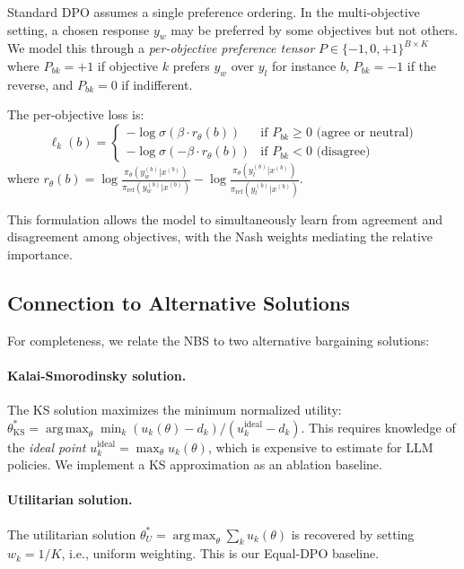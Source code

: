 \documentclass{article}
\DeclareMathOperator*{\argmax}{arg\,max}
\newcommand{\piref}{\pi_{\text{ref}}}
\begin{document}
Standard DPO assumes a single preference ordering.
In the multi-objective setting, a chosen response $y_w$ may be preferred by some objectives but not others.
We model this through a \emph{per-objective preference tensor} $P \in \{-1, 0, +1\}^{B \times K}$ where $P_{bk} = +1$ if objective $k$ prefers $y_w$ over $y_l$ for instance $b$, $P_{bk} = -1$ if the reverse, and $P_{bk} = 0$ if indifferent.

The per-objective loss is:
\begin{equation}
\ell_k(b) = \begin{cases}
-\log\sigma(\beta \cdot r_\theta(b)) & \text{if } P_{bk} \geq 0 \text{ (agree or neutral)} \\
-\log\sigma(-\beta \cdot r_\theta(b)) & \text{if } P_{bk} < 0 \text{ (disagree)}
\end{cases}
\label{eq:per_obj_loss}
\end{equation}
where $r_\theta(b) = \log\frac{\pi_\theta(y_w^{(b)}|x^{(b)})}{\piref(y_w^{(b)}|x^{(b)})} - \log\frac{\pi_\theta(y_l^{(b)}|x^{(b)})}{\piref(y_l^{(b)}|x^{(b)})}$.

This formulation allows the model to simultaneously learn from agreement and disagreement among objectives, with the Nash weights mediating the relative importance.

\subsection{Connection to Alternative Solutions}

For completeness, we relate the NBS to two alternative bargaining solutions:

\paragraph{Kalai-Smorodinsky solution.}
The KS solution maximizes the minimum normalized utility: $\theta^*_{\text{KS}} = \argmax_\theta \min_k (u_k(\theta) - d_k) / (u_k^{\text{ideal}} - d_k)$.
This requires knowledge of the \emph{ideal point} $u_k^{\text{ideal}} = \max_\theta u_k(\theta)$, which is expensive to estimate for LLM policies.
We implement a KS approximation as an ablation baseline.

\paragraph{Utilitarian solution.}
The utilitarian solution $\theta^*_U = \argmax_\theta \sum_k u_k(\theta)$ is recovered by setting $w_k = 1/K$, i.e., uniform weighting.
This is our Equal-DPO baseline.
\end{document}
